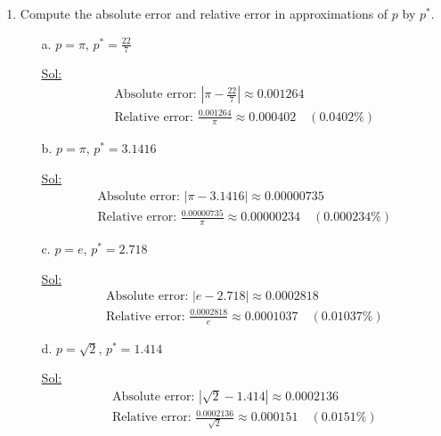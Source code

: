 \begin{enumerate}
\item Compute the absolute error and relative error in approximations
  of \( p \) by \( p^* \).
  \begin{itemize}
    \item[a.] \( p = \pi \), \( p^* = \frac{22}{7} \)

      \underline{Sol:}\\
      \[
        \begin{array}{l}
          \textrm{Absolute error: } \left| \pi - \frac{22}{7} \right|
          \approx 0.001264 \\
          \textrm{Relative error: } \frac{0.001264}{\pi} \approx
          0.000402 \quad (0.0402\%)
        \end{array}
      \]
      \bigbreak

    \item[b.] \( p = \pi \), \( p^* = 3.1416 \)

      \underline{Sol:}\\
      \[
        \begin{array}{l}
          \textrm{Absolute error: } \left| \pi - 3.1416 \right|
          \approx 0.00000735 \\
          \textrm{Relative error: } \frac{0.00000735}{\pi} \approx
          0.00000234 \quad (0.000234\%)
        \end{array}
      \]
      \bigbreak

    \item[c.] \( p = e \), \( p^* = 2.718 \)

      \underline{Sol:}\\
      \[
        \begin{array}{l}
          \textrm{Absolute error: } \left| e - 2.718 \right| \approx
          0.0002818 \\
          \textrm{Relative error: } \frac{0.0002818}{e} \approx
          0.0001037 \quad (0.01037\%)
        \end{array}
      \]
      \bigbreak

    \item[d.] \( p = \sqrt{2} \), \( p^* = 1.414 \)

      \underline{Sol:}\\
      \[
        \begin{array}{l}
          \textrm{Absolute error: } \left| \sqrt{2} - 1.414 \right|
          \approx 0.0002136 \\
          \textrm{Relative error: } \frac{0.0002136}{\sqrt{2}}
          \approx 0.000151 \quad (0.0151\%)
        \end{array}
      \]
      \bigbreak


\end{itemize}
\end{enumerate}
